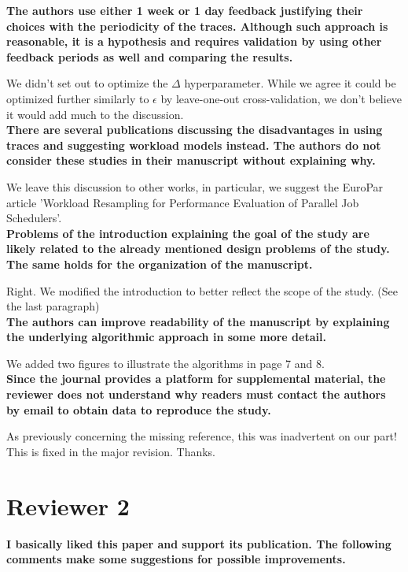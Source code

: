 \documentclass[]{article}
\begin{document}
\textbf{The authors use either 1 week or 1 day feedback justifying their
choices with the periodicity of the traces. Although such approach is
reasonable, it is a hypothesis and requires validation by using other feedback
periods as well and comparing the results. }

We didn't set out to optimize the $\Delta$ hyperparameter. While we agree it
could be optimized further similarly to $\epsilon$ by leave-one-out
cross-validation, we don't believe it would add much to the discussion.\\

\textbf{There are several publications discussing the disadvantages in using
traces and suggesting workload models instead. The authors do not consider
these studies in their manuscript without explaining why.}

We leave this discussion to other works, in particular, we suggest the EuroPar
article 'Workload Resampling for Performance Evaluation of Parallel Job
Schedulers'.\\

\textbf{Problems of the introduction explaining the goal of the study are
likely related to the already mentioned design problems of the study. The same
holds for the organization of the manuscript.}

Right. We modified the introduction to better reflect the scope of the study.
(See the last paragraph)\\

\textbf{The authors can improve readability of the manuscript by explaining the
underlying algorithmic approach in some more detail.}

We added two figures to illustrate the algorithms in page 7 and 8.\\

\textbf{Since the journal provides a platform for supplemental material, the
reviewer does not understand why readers must contact the authors by email to
obtain data to reproduce the study.}

As previously concerning the missing reference, this was inadvertent on our
part! This is fixed in the major revision. 
Thanks.


\section{Reviewer 2}

\textbf{I basically liked this paper and support its publication.  The
following comments make some suggestions for possible improvements.}
\end{document}
